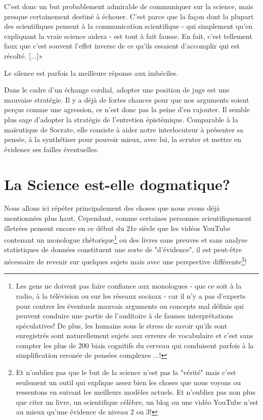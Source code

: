	C'est donc un but probablement admirable de communiquer sur la science, mais presque certainement destin\'e à \'echouer. C'est parce que la façon dont la plupart des scientifiques pensent à la communication scientifique - qui simplement qu'en expliquant la vraie science aidera - est tout à fait fausse. En fait, c'est tellement faux que c'est souvent l'effet inverse de ce qu'ils essaient d'accomplir qui est r\'ecolt\'e. [...]»
	
	\begin{fquote}Le silence est parfois la meilleure réponse aux imbéciles.
 	\end{fquote}
	
	\begin{tcolorbox}[title=Remarque,colframe=black,arc=10pt]
	Dans le cadre d’un échange cordial, adopter une position de juge est une mauvaise stratégie. Il y a déjà de fortes chances pour que nos arguments soient perçus comme une agression, ce n’est donc pas la peine d’en rajouter. Il semble plus sage d’adopter la stratégie de l’entretien épistémique. Comparable à la maïeutique de Socrate, elle consiste à aider notre interlocuteur à présenter sa pensée, à la synthétiser pour pouvoir mieux, avec lui, la scruter et mettre en évidence ses failles éventuelles.
	\end{tcolorbox}
	
	\pagebreak
	\section{La Science est-elle dogmatique?}
	Nous allons ici répéter principalement des choses que nous avons déjà mentionnées plus haut. Cependant, comme certaines personnes scientifiquement illetrées pensent encore en ce début du 21e siècle que les vidéos YouTube contenant un monologue rhétorique\footnote{Les gens ne doivent pas faire confiance aux monologues - que ce soit à la radio, à la télévision ou sur les réseaux sociaux - car il n'y a pas d'experts pour contrer les éventuels mauvais arguments ou concepts mal définis qui peuvent conduire une partie de l'auditoire à de fausses interprétations spéculatives! De plus, les humains sous le stress de savoir qu'ils sont enregistrés sont naturellement sujets aux erreurs de vocabulaire et c'est sans compter les plus de 200 biais cognitifs du cerveau qui conduisent parfois à la simplification erronée de pensées complexes ...!} ou des livres sans preuves et sans analyse statistiques de données  constituent une sorte de "d'évidence", il est peut-être nécessaire de revenir sur quelques sujets mais avec une perspective différente\footnote {Et n'oubliez pas que le but de la science n'est pas la "vérité" mais c'est seulement un outil qui explique assez bien les choses que nous voyons ou ressentons en suivant les meilleurs modèles actuels. Et n'oubliez pas non plus que citer un livre, un scientifique célèbre, un blog ou une vidéo YouTube n'est au mieux qu'une évidence de niveau 2 ou 3!}!
	
